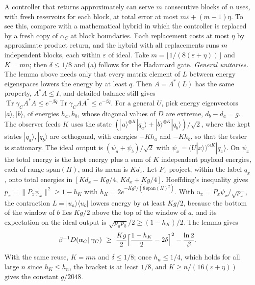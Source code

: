 \documentclass[11pt]{article}
\theoremstyle{definition}
\theoremstyle{remark}
\newcommand{\Tr}{\operatorname{Tr}}
\begin{document}
A controller that returns approximately can serve $m$ consecutive blocks of $n$ uses, with fresh reservoirs for each block, at total error at most $m\varepsilon+(m-1)\eta$. To see this, compare with a mathematical hybrid in which the controller is replaced by a fresh copy of $\alpha_C$ at block boundaries. Each replacement costs at most $\eta$ by approximate product return, and the hybrid with all replacements runs $m$ independent blocks, each within $\varepsilon$ of ideal. Take $m=\lfloor1/(8(\varepsilon+\eta))\rfloor$ and $K=mn$; then $\delta\le1/8$ and (a) follows for the Hadamard gate. \emph{General unitaries.} The lemma above needs only that every matrix element of $L$ between energy eigenspaces lowers the energy by at least $q$. Then $A=\Lambda^*(L)$ has the same property, $A^*A\le I$, and detailed balance still gives $\Tr\gamma_CA^*A\le e^{-\beta q}\Tr\gamma_CAA^*\le e^{-\beta q}$. For a general $U$, pick energy eigenvectors $|a\rangle,|b\rangle$, of energies $h_a,h_b$, whose diagonal values of $D$ are extreme, $d_b-d_a=g$. The observer feeds $K$ uses the state $(|a\rangle^{\otimes K}|q_a\rangle+|b\rangle^{\otimes K}|q_b\rangle)/\sqrt2$, where the kept states $|q_a\rangle,|q_b\rangle$ are orthogonal, with energies $-Kh_a$ and $-Kh_b$, so that the tester is stationary. The ideal output is $(\psi_a+\psi_b)/\sqrt2$ with $\psi_x=(U|x\rangle)^{\otimes K}|q_x\rangle$. On $\psi_x$ the total energy is the kept energy plus a sum of $K$ independent payload energies, each of range $\mathrm{span}(H)$, and its mean is $Kd_x$. Let $P_x$ project, within the label $q_x$, onto total energies in $[Kd_x-Kg/4,\,Kd_x+Kg/4]$. Hoeffding's inequality gives $p_x=\|P_x\psi_x\|^2\ge1-h_K$ with $h_K=2e^{-Kg^2/(8\,\mathrm{span}(H)^2)}$. With $u_x=P_x\psi_x/\sqrt{p_x}$, the contraction $L=|u_a\rangle\langle u_b|$ lowers energy by at least $Kg/2$, because the bottom of the window of $b$ lies $Kg/2$ above the top of the window of $a$, and its expectation on the ideal output is $\sqrt{p_ap_b}/2\ge(1-h_K)/2$. The lemma gives
\[
\beta^{-1}D(\alpha_C\|\gamma_C)\ \ge\ \frac{Kg}2\Bigl[\frac{1-h_K}2-2\delta\Bigr]^2-\frac{\ln2}\beta .
\]
With the same reuse, $K=mn$ and $\delta\le1/8$; once $h_n\le1/4$, which holds for all large $n$ since $h_K\le h_n$, the bracket is at least $1/8$, and $K\ge n/(16(\varepsilon+\eta))$ gives the constant $g/2048$.
\end{document}
